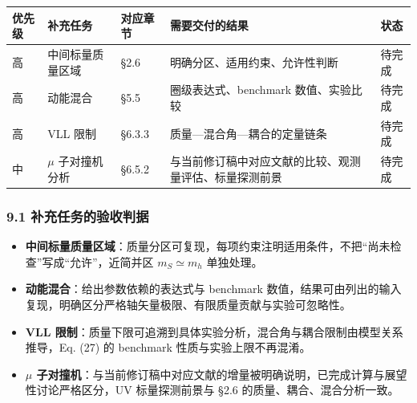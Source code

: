 \documentclass[
  chinese,
  UTF8]{ctexart}
\newcounter{none} %
\providecommand{\tightlist}{%
  \setlength{\itemsep}{0pt}\setlength{\parskip}{0pt}}
\begin{document}
{\def\LTcaptype{none} %
\begin{longtable}[]{@{}
  >{\raggedright\arraybackslash}p{}
  >{\raggedright\arraybackslash}p{}
  >{\raggedright\arraybackslash}p{}
  >{\raggedright\arraybackslash}p{}
  >{\raggedright\arraybackslash}p{}@{}}
\toprule\noalign{}
\begin{minipage}[b]{\linewidth}\raggedright
优先级
\end{minipage} & \begin{minipage}[b]{\linewidth}\raggedright
补充任务
\end{minipage} & \begin{minipage}[b]{\linewidth}\raggedright
对应章节
\end{minipage} & \begin{minipage}[b]{\linewidth}\raggedright
需要交付的结果
\end{minipage} & \begin{minipage}[b]{\linewidth}\raggedright
状态
\end{minipage} \\
\midrule\noalign{}
\endhead
\bottomrule\noalign{}
\endlastfoot
高 & 中间标量质量区域 & §2.6 & 明确分区、适用约束、允许性判断 &
待完成 \\
高 & 动能混合 & §5.5 & 圈级表达式、benchmark 数值、实验比较 & 待完成 \\
高 & VLL 限制 & §6.3.3 & 质量---混合角---耦合的定量链条 & 待完成 \\
中 & \ensuremath{\mu} 子对撞机分析 & §6.5.2 &
与当前修订稿中对应文献的比较、观测量评估、标量探测前景 & 待完成 \\
\end{longtable}
}

\subsubsection{9.1
补充任务的验收判据}\label{ux8865ux5145ux4efbux52a1ux7684ux9a8cux6536ux5224ux636e}

\begin{itemize}
\tightlist
\item
  \textbf{中间标量质量区域}：质量分区可复现，每项约束注明适用条件，不把``尚未检查''写成``允许''，近简并区
  \(m_S\simeq m_h\) 单独处理。
\item
  \textbf{动能混合}：给出参数依赖的表达式与 benchmark
  数值，结果可由列出的输入复现，明确区分严格轴矢量极限、有限质量贡献与实验可忽略性。
\item
  \textbf{VLL
  限制}：质量下限可追溯到具体实验分析，混合角与耦合限制由模型关系推导，Eq.
  (27) 的 benchmark 性质与实验上限不再混淆。
\item
  \textbf{\ensuremath{\mu}
  子对撞机}：与当前修订稿中对应文献的增量被明确说明，已完成计算与展望性讨论严格区分，UV
  标量探测前景与 §2.6 的质量、耦合、混合分析一致。
\end{itemize}
\end{document}
